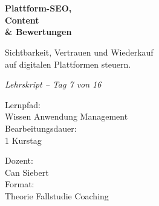 \documentclass[11pt,a4paper,oneside]{article}
\newcommand{\caveatfontfallback}{\itshape}
\newcommand\caveatfont{\caveatfontfallback}%
\begin{document}
\begin{titlepage}
  \pagestyle{empty}
  \vspace*{1.5cm}
  \\[2pt]
  \noindent{\color{lpAccent}\rule{\linewidth}{1.2pt}}\\[4pt]

  \vspace{3cm}
  {\sffamily\fontsize{30}{34}\selectfont\bfseries\color{lpInk}Plattform-SEO,\\Content\\\& Bewertungen\par}

  \vspace{0.7cm}
  {\sffamily\large\color{lpGray}Sichtbarkeit, Vertrauen und Wiederkauf\\auf digitalen Plattformen steuern.\par}

  \vspace{1.5cm}
  {\caveatfont\LARGE\color{lpAmber}Lehrskript -- Tag 7 von 16}\par

  \vfill

  \noindent\begin{minipage}{0.55\linewidth}
    {\sffamily\footnotesize\color{lpGray}Lernpfad:}\\
    {\sffamily\small\color{lpInk}Wissen \textrightarrow{} Anwendung \textrightarrow{} Management}\\[10pt]
    {\sffamily\footnotesize\color{lpGray}Bearbeitungsdauer:}\\
    {\sffamily\small\color{lpInk}1 Kurstag}
  \end{minipage}\hfill
  \begin{minipage}{0.4\linewidth}
    \raggedleft
    {\sffamily\footnotesize\color{lpGray}Dozent:}\\
    {\sffamily\small\color{lpInk}Can Siebert}\\[10pt]
    {\sffamily\footnotesize\color{lpGray}Format:}\\
    {\sffamily\small\color{lpInk}Theorie \textperiodcentered{} Fallstudie \textperiodcentered{} Coaching}
  \end{minipage}

  \vspace{0.5cm}
  \noindent{\color{lpAccent}\rule{\linewidth}{0.6pt}}
\end{titlepage}
\end{document}
